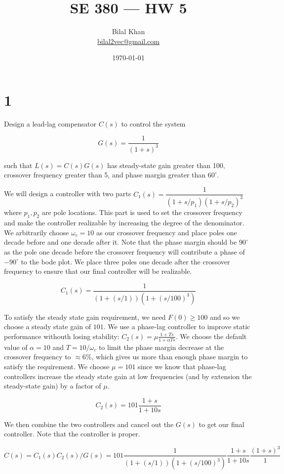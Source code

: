 \documentclass[11pt]{article}
\title{SE 380 — HW 5}
\author{Bilal Khan\\
\href{mailto:bilal2vec@gmail.com}{bilal2vec@gmail.com}}
\date{\today}
\begin{document}
\maketitle

\tableofcontents

\section{1}

Design a lead-lag compensator $C(s)$ to control the system

\[ G(s) = \dfrac{1}{(1 + s)^3} \]


such that $L(s) = C(s)G(s)$ has steady-state gain greater than 100, crossover frequency greater than 5, and phase margin greater than $60^\circ$.

We will design a controller with two parts $C_1(s) = \dfrac{1}{(1 + s/p_1)(1 + s/p_2)^3}$ where $p_1, p_2$ are pole locations. This part is used to set the crossover frequency and make the controller realizable by increasing the degree of the denominator. We arbitrarily choose $\omega_c = 10$ as our crossover frequency and place poles one decade before and one decade after it. Note that the phase margin should be $90^\circ$ as the pole one decade before the crossover frequency will contribute a phase of $-90^\circ$ to the bode plot. We place three poles one decade after the crossover frequency to ensure that our final controller will be realizable.

\[ C_1(s) = \dfrac{1}{(1 + (s / 1)) (1 + (s / 100)^3)} \]

To satisfy the steady state gain requirement, we need $F(0) \geq 100$ and so we choose a steady state gain of $101$. We use a phase-lag controller to improve static performance withouth losing stability: $C_2(s) = \mu \frac{1 + T s}{1 + \alpha T s}$. We choose the default value of $\alpha = 10$ and $T = 10 / \omega_c$ to limit the phase margin decrease at the crossover frequency to $\approx 6\%$, which gives us more than enough phase margin to satisfy the requirement. We choose $\mu = 101$ since we know that phase-lag controllers increase the steady state gain at low frequencies (and by extension the steady-state gain) by a factor of $\mu$.

\[ C_2(s) = 101 \dfrac{1 + s}{1 + 10s} \]

We then combine the two controllers and cancel out the $G(s)$ to get our final controller. Note that the controller is proper.

\[ C(s) = C_1(s) C_2(s) / G(s) = 101 \dfrac{1}{(1 + (s / 1)) (1 + (s / 100)^3)} \dfrac{1 + s}{1 + 10s} \dfrac{(1 + s)^3}{1} \]
\end{document}
